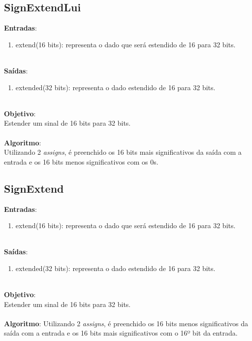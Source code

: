 \documentclass{article}
\begin{document}
    \newpage
    \subsection{SignExtendLui}
    \textbf{Entradas}:
    \begin{enumerate}
        \item extend(16 bits): representa o dado que será estendido de 16 para 32 bits.\\
    \end{enumerate}
    \\
    \textbf{Saídas}:
    \begin{enumerate}
        \item extended(32 bits): representa o dado estendido de 16 para 32 bits.\\
    \end{enumerate}
    \\
    \textbf{Objetivo}:\\
    Estender um sinal de 16 bits para 32 bits.
    \\
    \\
    \textbf{Algoritmo}:\\
    Utilizando 2 {\it assigns}, é preenchido os 16 bits mais significativos da saída com a entrada e os 16 bits menos significativos com os 0s.
    \\
    \subsection{SignExtend}
    \textbf{Entradas}:
    \begin{enumerate}
         \item extend(16 bits): representa o dado que será estendido de 16 para 32 bits.\\
    \end{enumerate}
    \\
    \textbf{Saídas}:
    \begin{enumerate}
        \item extended(32 bits): representa o dado estendido de 16 para 32 bits.\\
    \end{enumerate}
    \\
    \textbf{Objetivo}:\\
    Estender um sinal de 16 bits para 32 bits.
    \\
    \\
    \textbf{Algoritmo}:
    Utilizando 2 {\it assigns}, é preenchido os 16 bits menos significativos da saída com a entrada e os 16 bits mais significativos com o 16º bit da entrada.
    \\
\end{document}
